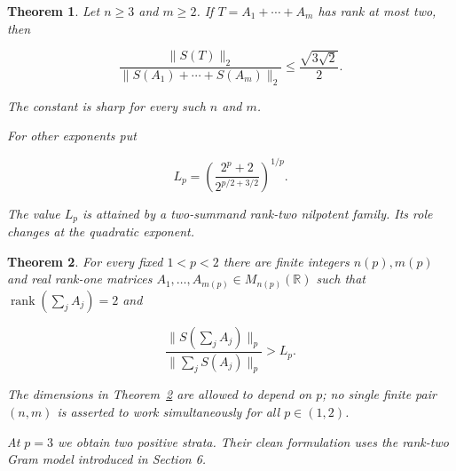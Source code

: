 \documentclass[11pt]{article}
\newtheorem{theorem}{Theorem}[section]
\begin{document}
\begin{theorem}
\label{thm:rank-two-frobenius}
Let $n\ge3$ and $m\ge2$. If
$T=A_1+\cdots+A_m$ has rank at most two, then

\[
\frac{\|S(T)\|_2}{\|S(A_1)+\cdots+S(A_m)\|_2}
\le \frac{\sqrt{3\sqrt2}}2.
\tag{1.6}\label{eq:1.6}
\]

The constant is sharp for every such $n$ and $m$.

For other exponents put

\[
L_p=\left(\frac{2^p+2}{2^{p/2+3/2}}\right)^{1/p}.
\tag{1.7}\label{eq:1.7}
\]

The value $L_p$ is attained by a two-summand rank-two nilpotent family. Its role
changes at the quadratic exponent.

\end{theorem}

\begin{theorem}
\label{thm:subquadratic-separation}
For every fixed $1<p<2$ there are finite integers $n(p),m(p)$
and real rank-one matrices $A_1,\ldots,A_{m(p)}\in M_{n(p)}(\mathbb R)$ such that
$\operatorname{rank}(\sum_jA_j)=2$ and

\[
\frac{\|S(\sum_jA_j)\|_p}{\|\sum_jS(A_j)\|_p}>L_p.
\tag{1.8}\label{eq:1.8}
\]

The dimensions in Theorem~\ref{thm:subquadratic-separation} are allowed to depend on $p$; no single finite pair
$(n,m)$ is asserted to work simultaneously for all $p\in(1,2)$.

At $p=3$ we obtain two positive strata. Their clean formulation uses the rank-two
Gram model introduced in Section 6.

\end{theorem}
\end{document}
